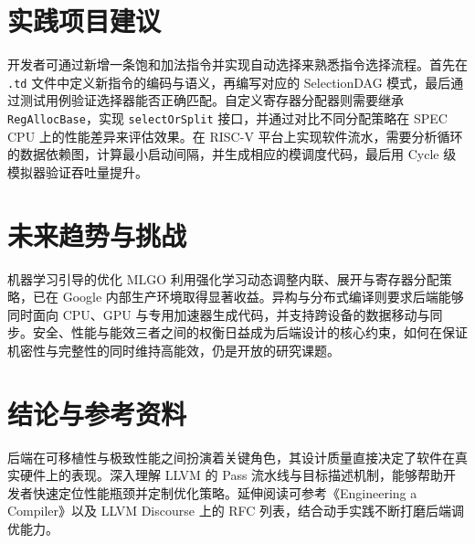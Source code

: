 \chapter{实践项目建议}
开发者可通过新增一条饱和加法指令并实现自动选择来熟悉指令选择流程。首先在 \texttt{.td} 文件中定义新指令的编码与语义，再编写对应的 SelectionDAG 模式，最后通过测试用例验证选择器能否正确匹配。自定义寄存器分配器则需要继承 \texttt{RegAllocBase}，实现 \texttt{selectOrSplit} 接口，并通过对比不同分配策略在 SPEC CPU 上的性能差异来评估效果。在 RISC-V 平台上实现软件流水，需要分析循环的数据依赖图，计算最小启动间隔，并生成相应的模调度代码，最后用 Cycle 级模拟器验证吞吐量提升。\par
\chapter{未来趋势与挑战}
机器学习引导的优化 MLGO 利用强化学习动态调整内联、展开与寄存器分配策略，已在 Google 内部生产环境取得显著收益。异构与分布式编译则要求后端能够同时面向 CPU、GPU 与专用加速器生成代码，并支持跨设备的数据移动与同步。安全、性能与能效三者之间的权衡日益成为后端设计的核心约束，如何在保证机密性与完整性的同时维持高能效，仍是开放的研究课题。\par
\chapter{结论与参考资料}
后端在可移植性与极致性能之间扮演着关键角色，其设计质量直接决定了软件在真实硬件上的表现。深入理解 LLVM 的 Pass 流水线与目标描述机制，能够帮助开发者快速定位性能瓶颈并定制优化策略。延伸阅读可参考《Engineering a Compiler》以及 LLVM Discourse 上的 RFC 列表，结合动手实践不断打磨后端调优能力。\par
